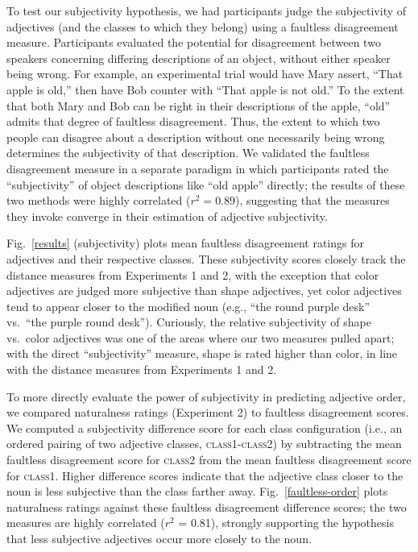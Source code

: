 \documentclass{pnastwo}
\begin{document}
\begin{article}
To test our subjectivity hypothesis, we had participants judge the subjectivity of adjectives (and the classes to which they belong) using a faultless disagreement measure. Participants evaluated the potential for disagreement between two speakers concerning differing descriptions of an object, without either speaker being wrong. For example, an experimental trial would have Mary assert, ``That apple is old,'' then have Bob counter with ``That apple is not old.'' 
To the extent that both Mary and Bob can be right in their descriptions of the apple, ``old'' admits that degree of faultless disagreement. 
Thus, the extent to which two people can disagree about a description without one necessarily being wrong determines the subjectivity of that description. 
We validated the faultless disagreement measure in a separate paradigm in which participants rated the ``subjectivity'' of object descriptions like ``old apple'' directly; the results of these two methods were highly correlated ($r^{2} = 0.89$), suggesting that the measures they invoke converge in their estimation of adjective subjectivity.

Fig.~\ref{results} (subjectivity) plots mean faultless disagreement ratings for adjectives and their respective classes. These subjectivity scores closely track the distance measures from Experiments 1 and 2, with the exception that color adjectives are judged more subjective than shape adjectives, yet color adjectives tend to appear closer to the modified noun (e.g., ``the round purple desk'' vs.~``the purple round desk''). Curiously, the relative subjectivity of shape vs.~color adjectives was one of the areas where our two measures pulled apart; with the direct ``subjectivity'' measure, shape is rated higher than color, in line with the distance measures from Experiments 1 and 2.

To more directly evaluate the power of subjectivity in predicting adjective order, we compared naturalness ratings (Experiment 2) to faultless disagreement scores. We  computed a subjectivity difference score for each class configuration (i.e., an ordered pairing of two adjective classes, \textsc{class1}-\textsc{class2}) by subtracting the mean faultless disagreement score for \textsc{class2} from the mean faultless disagreement score for \textsc{class1}. Higher difference scores indicate that the adjective class closer to the noun is less subjective than the class farther away. Fig.~\ref{faultless-order} plots naturalness ratings  against these faultless disagreement difference scores; the two measures are highly correlated ($r^2$ = 0.81), strongly supporting the hypothesis that less subjective adjectives occur more closely to the noun.


\end{article}
\end{document}
